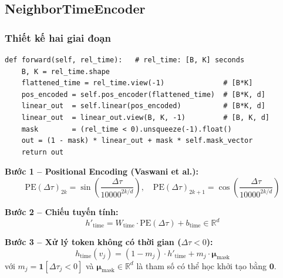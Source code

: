 \documentclass[12pt,a4paper]{article}
\begin{document}
\subsection{NeighborTimeEncoder}

\subsubsection{Thiết kế hai giai đoạn}

\begin{codebox}[title={encoders.py -- NeighborTimeEncoder.forward() (rút gọn)}]
\begin{lstlisting}
def forward(self, rel_time):   # rel_time: [B, K] seconds
    B, K = rel_time.shape
    flattened_time = rel_time.view(-1)              # [B*K]
    pos_encoded = self.pos_encoder(flattened_time)  # [B*K, d]
    linear_out  = self.linear(pos_encoded)          # [B*K, d]
    linear_out  = linear_out.view(B, K, -1)         # [B, K, d]
    mask        = (rel_time < 0).unsqueeze(-1).float()
    out = (1 - mask) * linear_out + mask * self.mask_vector
    return out
\end{lstlisting}
\end{codebox}

\begin{mathbox}[title={Công thức toán học đầy đủ}]
\textbf{Bước 1 -- Positional Encoding (Vaswani et al.):}
\begin{equation}
  \text{PE}(\Delta\tau)_{2k}   = \sin\!\left(\frac{\Delta\tau}{10000^{2k/d}}\right),
  \quad
  \text{PE}(\Delta\tau)_{2k+1} = \cos\!\left(\frac{\Delta\tau}{10000^{2k/d}}\right)
  \label{eq:pe_sin}
\end{equation}

\textbf{Bước 2 -- Chiếu tuyến tính:}
\begin{equation}
  h'_\text{time} = W_\text{time} \cdot \text{PE}(\Delta\tau) + b_\text{time}
  \in \mathbb{R}^d
\end{equation}

\textbf{Bước 3 -- Xử lý token không có thời gian ($\Delta\tau < 0$):}
\begin{equation}
  \boxed{h_\text{time}(v_j) = (1 - m_j) \cdot h'_\text{time} + m_j \cdot \bm{\mu}_\text{mask}}
  \label{eq:time_enc}
\end{equation}
với $m_j = \mathbf{1}[\Delta\tau_j < 0]$ và $\bm{\mu}_\text{mask} \in \mathbb{R}^d$
là tham số có thể học khởi tạo bằng $\mathbf{0}$.
\end{mathbox}
\end{document}
